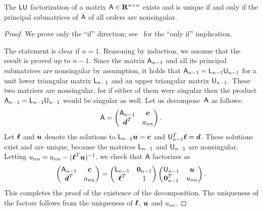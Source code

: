 \begin{proposition}
    \label{proposition:linear_existence_lu}
    The $\mathsf L \mathsf U$ factorization of a matrix $\mathsf A \in \mathbf R^{n \times n}$ exists and is unique if and only if
    the principal submatrices of $\mathsf A$ of all orders are nonsingular.
\end{proposition}
\begin{proof}
    We prove only the ``if'' direction; see~\cite[Theorem 3.4]{MR2265914} for the ``only if'' implication.

    The statement is clear if $n = 1$.
    Reasoning by induction,
    we assume that the result is proved up to $n - 1$.
    Since the matrix $\mathsf A_{n-1}$ and all its principal submatrices are nonsingular by assumption,
    it holds that $\mathsf A_{n-1} = \mathsf L_{n-1} \mathsf U_{n-1}$
    for a unit lower triangular matrix $\mathsf L_{n-1}$ and an upper triangular matrix $\mathsf U_{n-1}$.
    These two matrices are nonsingular,
    for if either of them were singular then the product $\mathsf A_{n-1} = \mathsf L_{n-1} \mathsf U_{n-1}$ would be singular as well.
    Let us decompose~$\mathsf A$ as follows:
    \[
        \mathsf A =
        \begin{pmatrix}
            \mathsf A_{n-1} & \mathbf{\boldsymbol{c}} \\
            \mathbf{\boldsymbol{d}}^T & a_{nn}
        \end{pmatrix}.
    \]
    Let $\mathbf{\boldsymbol{\ell}}$ and $\mathbf{\boldsymbol{u}}$ denote the solutions to $\mathsf L_{n-1} \mathbf{\boldsymbol{u}} = \mathbf{\boldsymbol{c}}$ and $\mathsf U_{n-1}^T \mathbf{\boldsymbol{\ell}} = \mathbf{\boldsymbol{d}}$.
    These solutions exist and are unique,
    because the matrices $\mathsf L_{n-1}$ and $\mathsf U_{n-1}$ are nonsingular.
    Letting $u_{nn} = a_{nn} - (\mathbf{\boldsymbol{\ell}}^T \mathbf{\boldsymbol{u}})^{-1}$,
    we check that $\mathsf A$ factorizes as
    \[
        \begin{pmatrix}
            \mathsf A_{n-1} & \mathbf{\boldsymbol{c}} \\
            \mathbf{\boldsymbol{d}}^T & a_{nn}
        \end{pmatrix}
        =
        \begin{pmatrix}
            \mathsf L_{n-1} & \mathbf{\boldsymbol{0}}_{n-1} \\
            \mathbf{\boldsymbol{\ell}}^T & 1
        \end{pmatrix}
        \begin{pmatrix}
            \mathsf U_{n-1} & \mathbf{\boldsymbol{u}} \\
            \mathbf{\boldsymbol{0}}_{n-1}^T & u_{nn}
        \end{pmatrix}.
    \]
    This completes the proof of the existence of the decomposition.
    The uniqueness of the factors follows from the uniqueness of $\mathbf{\boldsymbol{\ell}}$, $\mathbf{\boldsymbol{u}}$ and $u_{nn}$.
\end{proof}


